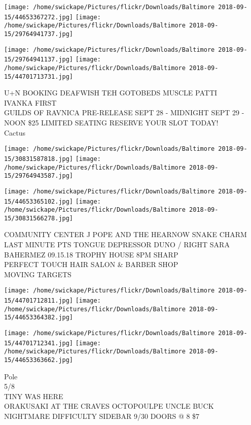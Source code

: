 \documentclass[10pt,letterpaper]{article}
\begin{document}
\texttt{[image: /home/swickape/Pictures/flickr/Downloads/Baltimore 2018-09-15/44653367272.jpg]}
\texttt{[image: /home/swickape/Pictures/flickr/Downloads/Baltimore 2018-09-15/29764941737.jpg]}

\texttt{[image: /home/swickape/Pictures/flickr/Downloads/Baltimore 2018-09-15/29764941137.jpg]}
\texttt{[image: /home/swickape/Pictures/flickr/Downloads/Baltimore 2018-09-15/44701713731.jpg]}

U+N BOOKING DEAFWISH TEH GOTOBEDS MUSCLE PATTI\\
IVANKA FIRST\\
GUILDS OF RAVNICA PRE{-}RELEASE SEPT 28 {-} MIDNIGHT SEPT 29 {-} NOON \$25 LIMITED SEATING RESERVE YOUR SLOT TODAY!\\
Cactus
\pagebreak

\texttt{[image: /home/swickape/Pictures/flickr/Downloads/Baltimore 2018-09-15/30831587818.jpg]}
\texttt{[image: /home/swickape/Pictures/flickr/Downloads/Baltimore 2018-09-15/29764943587.jpg]}

\texttt{[image: /home/swickape/Pictures/flickr/Downloads/Baltimore 2018-09-15/44653365102.jpg]}
\texttt{[image: /home/swickape/Pictures/flickr/Downloads/Baltimore 2018-09-15/30831566278.jpg]}

COMMUNITY CENTER J POPE AND THE HEARNOW SNAKE CHARM\\
LAST MINUTE PTS TONGUE DEPRESSOR DUNO / RIGHT SARA BAHERMEZ 09.15.18 TROPHY HOUSE 8PM SHARP\\
PERFECT TOUCH HAIR SALON \& BARBER SHOP\\
MOVING TARGETS
\pagebreak

\texttt{[image: /home/swickape/Pictures/flickr/Downloads/Baltimore 2018-09-15/44701712811.jpg]}
\texttt{[image: /home/swickape/Pictures/flickr/Downloads/Baltimore 2018-09-15/44653364382.jpg]}

\texttt{[image: /home/swickape/Pictures/flickr/Downloads/Baltimore 2018-09-15/44701712341.jpg]}
\texttt{[image: /home/swickape/Pictures/flickr/Downloads/Baltimore 2018-09-15/44653363662.jpg]}

Pole\\
5/8\\
TINY WAS HERE\\
ORAKUSAKI AT THE CRAVES OCTOPOULPE UNCLE BUCK NIGHTMARE DIFFICULTY SIDEBAR 9/30 DOORS @ 8 \$7
\pagebreak
\end{document}
